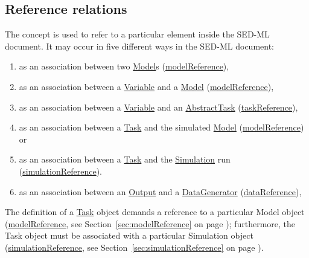 \subsection{Reference relations}
\label{sec:reference}

The  concept is used to refer to a particular element inside the SED-ML document. It may occur in five different ways in the SED-ML document:
%
\begin{enumerate}
\item{as an association between two \hyperref[class:model]{Model}s (\hyperref[sec:modelReference]{modelReference}),}
\item{as an association between a \hyperref[class:variable]{Variable} and a \hyperref[class:model]{Model} (\hyperref[sec:modelReference]{modelReference}),}
\item{as an association between a \hyperref[class:variable]{Variable} and an \hyperref[class:abstractTask]{AbstractTask} (\hyperref[sec:taskReference]{taskReference}),}
\item{as an association between a \hyperref[class:task]{Task} and the simulated \hyperref[class:model]{Model} (\hyperref[sec:modelReference]{modelReference}) or}
\item{as an association between a \hyperref[class:task]{Task} and the \hyperref[class:simulation]{Simulation} run (\hyperref[sec:simulationReference]{simulationReference}).}
\item{as an association between an \hyperref[class:output]{Output} and a \hyperref[class:dataGenerator]{DataGenerator} (\hyperref[sec:dataReference]{dataReference}),}
\end{enumerate}
%
The definition of a \hyperref[class:task]{Task} object demands a reference to a particular Model object (\hyperref[sec:modelReference]{modelReference}, see Section~\ref{sec:modelReference} on page \pageref{sec:modelReference}); furthermore, the Task object must be associated with a particular Simulation object (\hyperref[sec:simulationReference]{simulationReference}, see Section~\ref{sec:simulationReference} on page \pageref{sec:simulationReference}).

